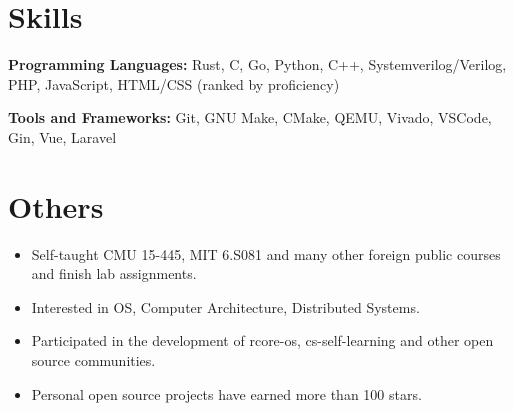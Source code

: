 \documentclass{resume}
\begin{document}
\section{Skills}
\textbf{Programming Languages:} \small Rust, C, Go, Python, C++, Systemverilog/Verilog, PHP, JavaScript, HTML/CSS (ranked by proficiency)

\textbf{Tools and Frameworks:} \small Git, GNU Make, CMake, QEMU, Vivado, VSCode, Gin, Vue, Laravel

\section{Others}
\begin{itemize}
  \item Self-taught CMU 15-445, MIT 6.S081 and many other foreign public courses and finish lab assignments.
  \item Interested in OS, Computer Architecture, Distributed Systems.
  \item Participated in the development of rcore-os, cs-self-learning and other open source communities.
  \item Personal open source projects have earned more than 100 stars.
\end{itemize}
\end{document}
